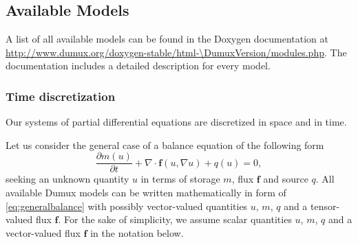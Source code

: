 \subsection{Available Models}
A list of all available models can be found
in the Doxygen documentation at
\url{http://www.dumux.org/doxygen-stable/html-\DumuxVersion/modules.php}.
The documentation includes a detailed description for every model.

\subsubsection{Time discretization}

Our systems of partial differential equations are discretized in space and in time.

Let us consider the general case of a balance equation of the following form
\begin{equation}\label{eq:generalbalance}
\frac{\partial m(u)}{\partial t} + \nabla\cdot\mathbf{f}(u, \nabla u) + q(u) = 0,
\end{equation}
seeking an unknown quantity $u$ in terms of storage $m$, flux $\mathbf{f}$ and source $q$.
All available Dumux models can be written mathematically in form of \eqref{eq:generalbalance}
with possibly vector-valued quantities $u$, $m$, $q$ and a tensor-valued flux $\mathbf{f}$.
For the sake of simplicity, we assume scalar quantities $u$, $m$, $q$ and a vector-valued
flux $\mathbf{f}$ in the notation below.

